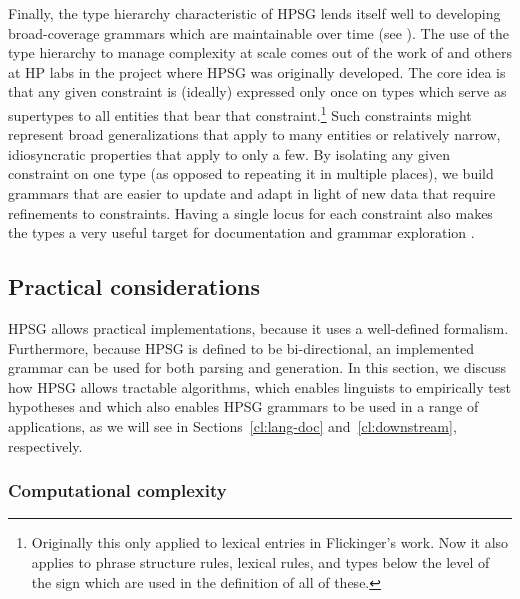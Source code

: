 \documentclass[output=paper,nonflat]{langsci/langscibook}
\begin{document}
Finally, the type hierarchy characteristic of HPSG lends itself well to developing broad-coverage grammars which are maintainable over time (see \citealt{Syg:Win:11}). The use of the type hierarchy to manage complexity at scale comes out of the work of \citet{Flickinger87} and others at HP labs in the project where HPSG was originally developed. The core idea is that any given constraint is (ideally) expressed only once on types which serve as supertypes to all entities that bear that constraint.\footnote{Originally this only applied to lexical entries in Flickinger's work. Now it also applies to phrase structure rules, lexical rules, and types below the level of the sign which are used in the definition of all of these.} Such constraints might represent broad generalizations that apply to many entities or relatively narrow, idiosyncratic properties that apply to only a few. By isolating any given constraint on one type (as opposed to repeating it in multiple places), we build grammars that are easier to update and adapt in light of new data that require refinements to constraints. Having a single locus for each constraint also makes the types a very useful target for documentation \citep{Hashimoto-etal:07} and grammar exploration \citep{Letcher:18}. 


\subsection{Practical considerations}
\label{cl:prac}

HPSG allows practical implementations,
because it uses a well-defined formalism.
Furthermore, because HPSG is defined to be bi-directional,
an implemented grammar can be used for both parsing and generation.
In this section, we discuss how HPSG allows tractable algorithms,
which enables linguists to empirically test hypotheses
and which also enables HPSG grammars to be used in a range of applications,
as we will see in Sections~\ref{cl:lang-doc} and~\ref{cl:downstream}, respectively.

\subsubsection{Computational complexity}
\label{cl:prac:comp}
\end{document}

